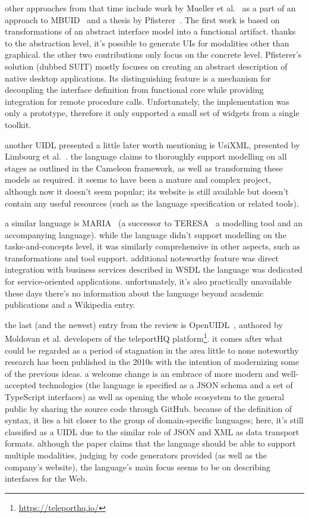 other approaches from that time include work by Mueller et al.~\cite{Mueller2001-un} as a part of an approach to MBUID~\cite{elwert1995Modelling} and a thesis by Pfisterer~\cite{pfistererSemantic2002}.
The first work is based on transformations of an abstract interface model into a functional artifact.
thanks to the abstraction level, it's possible to generate UIs for modalities other than graphical.
the other two contributions only focus on the concrete level.
Pfisterer's solution (dubbed SUIT) mostly focuses on creating an abstract description of native desktop applications.
Its distinguishing feature is a mechanism for decoupling the interface definition from functional core while providing integration for remote procedure calls.
Unfortunately, the implementation was only a prototype, therefore it only supported a small set of widgets from a single toolkit.

another UIDL presented a little later worth mentioning is UsiXML, presented by Limbourg et al.~\cite{limbourg2004usixml,limbourgusixml}.
the language claims to thoroughly support modelling on all stages as outlined in the Cameleon framework, as well as transforming these models as required.
it seems to have been a mature and complex project, although now it doesn't seem popular;
its website is still available but doesn't contain any useful resources (such as the language specification or related tools).

a similar language is MARIA~\cite{Paterno2009-nj} (a successor to TERESA~\cite{Mori2004-sr}\,\textemdash\,a modelling tool and an accompanying language).
while the language didn't support modelling on the tasks-and-concepts level, it was similarly comprehensive in other aspects, such as transformations and tool support.
additional noteworthy feature was direct integration with business services described in WSDL\,\textemdash\,the language was dedicated for service-oriented applications.
unfortunately, it's also practically unavailable these days\,\textemdash\,there's no information about the language beyond academic publications and a Wikipedia entry.

the last (and the newest) entry from the review is OpenUIDL~\cite{moldovan2020open}, authored by Moldovan et al.\,\textemdash\,developers of the teleportHQ platform\footnote{\url{https://teleporthq.io/}}.
it comes after what could be regarded as a period of stagnation in the area\,\textemdash\,little to none noteworthy research has been published in the 2010s with the intention of modernizing some of the previous ideas.
a welcome change is an embrace of more modern and well-accepted technologies (the language is specified as a JSON schema and a set of TypeScript interfaces) as well as opening the whole ecosystem to the general public by sharing the source code through GitHub.
because of the definition of syntax, it lies a bit closer to the group of domain-specific languages;
here, it's still classified as a UIDL due to the similar role of JSON and XML as data transport formats.
although the paper claims that the language should be able to support multiple modalities, judging by code generators provided (as well as the company's website), the language's main focus seems to be on describing interfaces for the Web.

